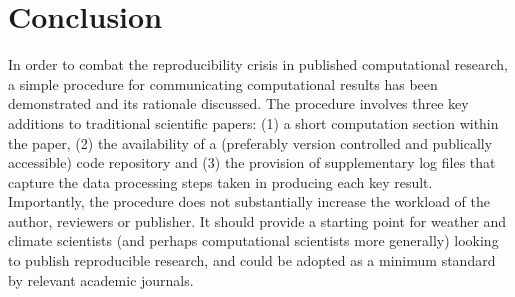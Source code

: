 \section{Conclusion}

In order to combat the reproducibility crisis in published computational research, a simple procedure for communicating computational results has been demonstrated \citep{Irving2015} and its rationale discussed. The procedure involves three key additions to traditional scientific papers: (1) a short computation section within the paper, (2) the availability of a (preferably version controlled and publically accessible) code repository and (3) the provision of supplementary log files that capture the data processing steps taken in producing each key result. Importantly, the procedure does not substantially increase the workload of the author, reviewers or publisher. It should provide a starting point for weather and climate scientists (and perhaps computational scientists more generally) looking to publish reproducible research, and could be adopted as a minimum standard by relevant academic journals.
